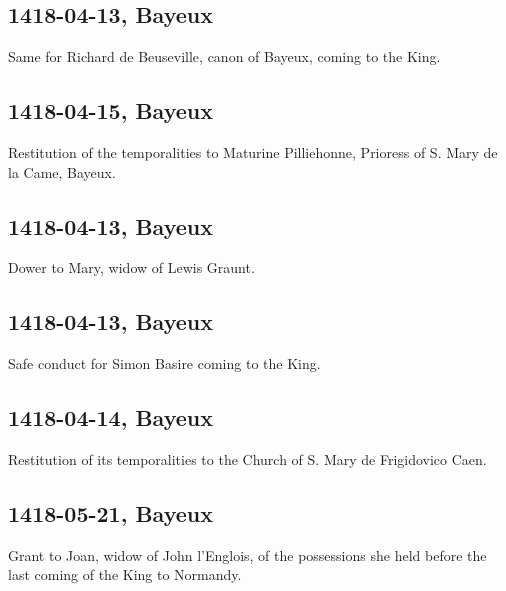 \documentclass[a4paper,12pt,twoside]{book}
\begin{document}
            \subsection{1418-04-13, Bayeux}
            
                     Same for Richard de Beuseville, canon of Bayeux, coming to the King.
                  
            \subsection{1418-04-15, Bayeux}
            
                     Restitution of the temporalities to Maturine Pilliehonne, Prioress of S. Mary de la Came, Bayeux.
                  
            \subsection{1418-04-13, Bayeux}
            
                     Dower to Mary, widow of Lewis Graunt.
                  
            \subsection{1418-04-13, Bayeux}
            
                     Safe conduct for Simon Basire coming to the King.
                  
            \subsection{1418-04-14, Bayeux}
            
                     Restitution of its temporalities to the Church of S. Mary de Frigidovico Caen.
                  
            \subsection{1418-05-21, Bayeux}
            
                     Grant to Joan, widow of John l'Englois, of the possessions she held before the last coming of the King to Normandy.
                  
\end{document}
